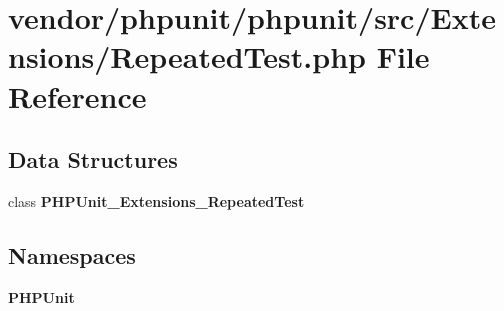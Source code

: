 \section{vendor/phpunit/phpunit/src/\+Extensions/\+Repeated\+Test.php File Reference}
\label{_repeated_test_8php}
\subsection*{Data Structures}
\begin{DoxyCompactItemize}
\item 
class {\bf P\+H\+P\+Unit\+\_\+\+Extensions\+\_\+\+Repeated\+Test}
\end{DoxyCompactItemize}
\subsection*{Namespaces}
\begin{DoxyCompactItemize}
\item 
 {\bf P\+H\+P\+Unit}
\end{DoxyCompactItemize}
